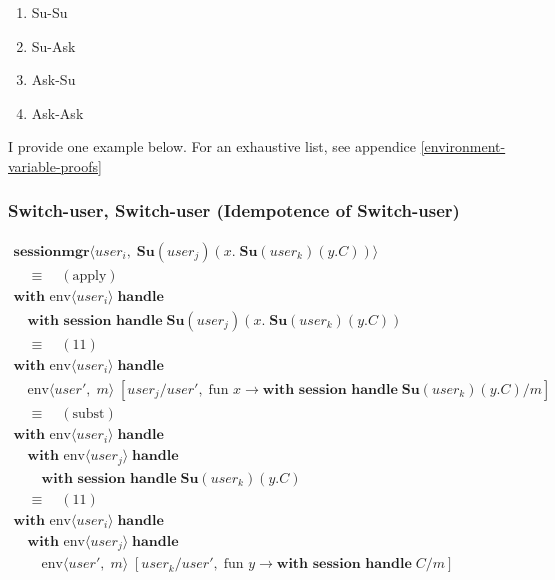 \documentclass[logo,bsc,singlespacing,parskip]{infthesis}
\begin{document}
\begin{enumerate}
    \item Su-Su
    \item Su-Ask
    \item Ask-Su
    \item Ask-Ask
\end{enumerate}
    

I provide one example below. For an exhaustive list, see appendice \ref{environment-variable-proofs}
\subsubsection*{Switch-user, Switch-user (Idempotence of Switch-user)}


\[
\begin{array}{l}
\textbf{sessionmgr} \langle \mathit{user}_i,\; \textbf{Su}(\mathit{user}_j)(x.\;\textbf{Su}(\mathit{user}_k)(y.C)) \rangle \\[5pt]

\quad\equiv\quad (\text{apply}) \\[5pt]
\textbf{with }\text{}\text{env} \langle \mathit{user}_i \rangle\; \textbf{handle} \\
\quad\textbf{with session handle}\; \textbf{Su}(\mathit{user}_j)(x.\;\textbf{Su}(\mathit{user}_k)(y.C)) \\[5pt]

\quad\equiv\quad (11) \\[5pt]
\textbf{with }\text{env} \langle \mathit{user}_i \rangle\; \textbf{handle} \\
\quad\textbf{}\text{env} \langle \mathit{user}',\; m \rangle\; [\mathit{user}_j/\mathit{user}',\; \text{fun } x \rightarrow \textbf{with session handle}\; \textbf{Su}(\mathit{user}_k)(y.C)/m] \\[5pt]

\quad\equiv\quad (\text{subst}) \\[5pt]
\textbf{with }\text{env} \langle \mathit{user}_i \rangle\; \textbf{handle} \\
\quad\textbf{with }\text{env} \langle \mathit{user}_j \rangle\; \textbf{handle} \\
\qquad\textbf{with session handle}\; \textbf{Su}(\mathit{user}_k)(y.C) \\[5pt]

\quad\equiv\quad (11) \\[5pt]
\textbf{with }\text{env} \langle \mathit{user}_i \rangle\; \textbf{handle} \\
\quad\textbf{with }\text{env} \langle \mathit{user}_j \rangle\; \textbf{handle} \\
\qquad\textbf{}\text{env} \langle \mathit{user}',\; m \rangle\; [\mathit{user}_k/\mathit{user}',\; \text{fun } y \rightarrow \textbf{with session handle}\; C/m] \\[5pt]


\end{array}\]
\end{document}
